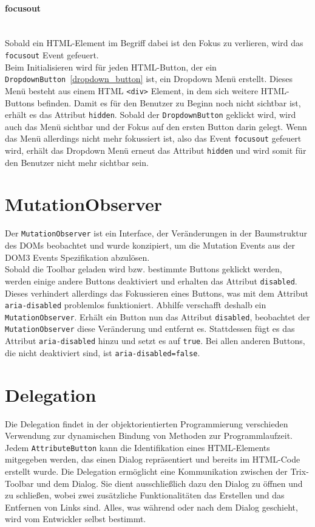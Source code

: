 \paragraph{focusout}\mbox{}\\
Sobald ein HTML-Element im Begriff dabei ist den Fokus zu verlieren, wird das \texttt{focusout} Event gefeuert.\\
Beim Initialisieren wird für jeden HTML-Button, der ein \texttt{DropdownButton}~\ref{dropdown_button} ist,  ein Dropdown Menü erstellt. Dieses Menü besteht aus einem HTML  \texttt{<div>} Element, in dem sich weitere HTML-Buttons befinden. Damit es für den Benutzer zu Beginn noch nicht sichtbar ist, erhält es das Attribut \texttt{hidden}. Sobald der \texttt{DropdownButton} geklickt wird, wird auch das Menü sichtbar und der Fokus auf den ersten Button darin gelegt. Wenn das Menü allerdings nicht mehr fokussiert ist, also das Event \texttt{focusout} gefeuert wird, erhält das Dropdown Menü erneut das Attribut \texttt{hidden} und wird somit für den Benutzer nicht mehr sichtbar sein.

\section{MutationObserver}
Der \texttt{MutationObserver} ist ein Interface, der Veränderungen in der Baumstruktur des DOMs beobachtet und wurde konzipiert, um die Mutation Events aus der DOM3 Events Spezifikation abzulösen.\\
Sobald die Toolbar geladen wird bzw. bestimmte Buttons geklickt werden, werden einige andere Buttons deaktiviert und erhalten das Attribut \texttt{disabled}. Dieses verhindert allerdings das Fokussieren eines Buttons, was mit dem Attribut \texttt{aria-disabled} problemlos funktioniert. Abhilfe verschafft deshalb ein \texttt{MutationObserver}. Erhält ein Button nun das Attribut \texttt{disabled}, beobachtet der \texttt{MutationObserver} diese Veränderung und entfernt es. Stattdessen fügt es das Attribut \texttt{aria-disabled} hinzu und setzt es auf \texttt{true}. Bei allen anderen Buttons, die nicht deaktiviert sind, ist \texttt{aria-disabled=false}.

\section{Delegation}
Die Delegation findet in der objektorientierten Programmierung verschieden Verwendung zur dynamischen Bindung von Methoden zur Programmlaufzeit.\\
Jedem \texttt{AttributeButton} kann die Identifikation eines HTML-Elements mitgegeben werden, das einen Dialog repräsentiert und bereits im HTML-Code erstellt wurde. Die Delegation ermöglicht eine Kommunikation zwischen der Trix-Toolbar und dem Dialog. Sie dient ausschließlich dazu den Dialog zu öffnen und zu schließen, wobei zwei zusätzliche Funktionalitäten das Erstellen und das Entfernen von Links sind. Alles, was während oder nach dem Dialog geschieht, wird vom Entwickler selbst bestimmt.

